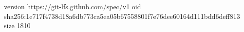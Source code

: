 version https://git-lfs.github.com/spec/v1
oid sha256:1e717f4738d18a6db773ca5ea05b67558801f7e76dee60164d111bdd6deff813
size 1810
